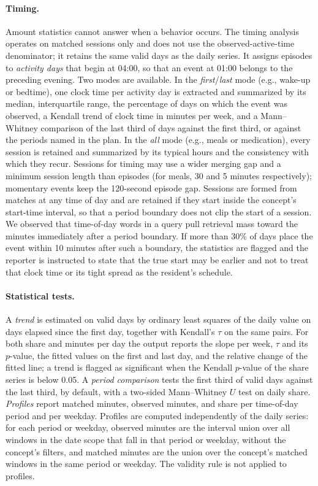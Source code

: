 \paragraph{Timing.}
Amount statistics cannot answer when a behavior occurs. The timing analysis operates on matched sessions only and does not use the observed-active-time denominator; it retains the same valid days as the daily series. It assigns episodes to \emph{activity days} that begin at 04:00, so that an event at 01:00 belongs to the preceding evening. Two modes are available. In the \emph{first}/\emph{last} mode (e.g., wake-up or bedtime), one clock time per activity day is extracted and summarized by its median, interquartile range, the percentage of days on which the event was observed, a Kendall trend of clock time in minutes per week, and a Mann--Whitney comparison of the last third of days against the first third, or against the periods named in the plan. In the \emph{all} mode (e.g., meals or medication), every session is retained and summarized by its typical hours and the consistency with which they recur. Sessions for timing may use a wider merging gap and a minimum session length than episodes (for meals, 30 and 5 minutes respectively); momentary events keep the 120-second episode gap. Sessions are formed from matches at any time of day and are retained if they start inside the concept's start-time interval, so that a period boundary does not clip the start of a session. We observed that time-of-day words in a query pull retrieval mass toward the minutes immediately after a period boundary. If more than 30\% of days place the event within 10 minutes after such a boundary, the statistics are flagged and the reporter is instructed to state that the true start may be earlier and not to treat that clock time or its tight spread as the resident's schedule.

\paragraph{Statistical tests.}
A \emph{trend} is estimated on valid days by ordinary least squares of the daily value on days elapsed since the first day, together with Kendall's $\tau$ on the same pairs. For both share and minutes per day the output reports the slope per week, $\tau$ and its $p$-value, the fitted values on the first and last day, and the relative change of the fitted line; a trend is flagged as significant when the Kendall $p$-value of the share series is below 0.05. A \emph{period comparison} tests the first third of valid days against the last third, by default, with a two-sided Mann--Whitney $U$ test on daily share. \emph{Profiles} report matched minutes, observed minutes, and share per time-of-day period and per weekday. Profiles are computed independently of the daily series: for each period or weekday, observed minutes are the interval union over all windows in the date scope that fall in that period or weekday, without the concept's filters, and matched minutes are the union over the concept's matched windows in the same period or weekday. The validity rule is not applied to profiles.


